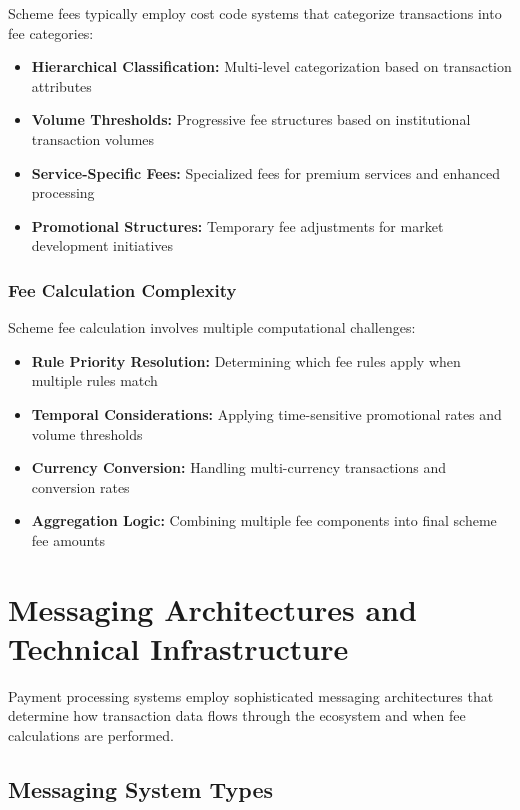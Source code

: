 Scheme fees typically employ cost code systems that categorize transactions into fee categories:

\begin{itemize}
    \item \textbf{Hierarchical Classification:} Multi-level categorization based on transaction attributes
    \item \textbf{Volume Thresholds:} Progressive fee structures based on institutional transaction volumes
    \item \textbf{Service-Specific Fees:} Specialized fees for premium services and enhanced processing
    \item \textbf{Promotional Structures:} Temporary fee adjustments for market development initiatives
\end{itemize}

\subsubsection{Fee Calculation Complexity}

Scheme fee calculation involves multiple computational challenges:

\begin{itemize}
    \item \textbf{Rule Priority Resolution:} Determining which fee rules apply when multiple rules match
    \item \textbf{Temporal Considerations:} Applying time-sensitive promotional rates and volume thresholds
    \item \textbf{Currency Conversion:} Handling multi-currency transactions and conversion rates
    \item \textbf{Aggregation Logic:} Combining multiple fee components into final scheme fee amounts
\end{itemize}

\section{Messaging Architectures and Technical Infrastructure}

Payment processing systems employ sophisticated messaging architectures that determine how transaction data flows through the ecosystem and when fee calculations are performed.

\subsection{Messaging System Types}

